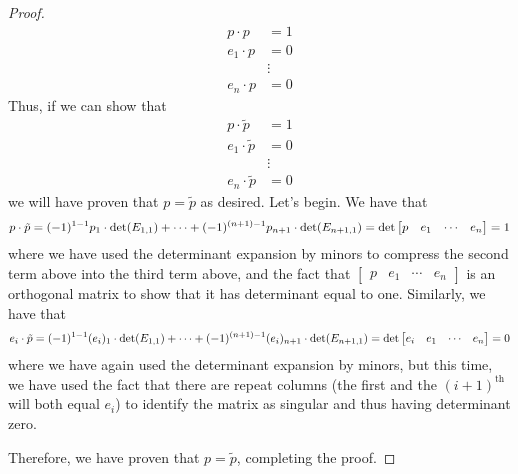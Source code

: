 \documentclass[../psets.tex]{subfiles}
\begin{document}
\begin{enumerate}[label={\textbf{4.4.\roman*.}}]
\begin{proof}
        \begin{align*}
            p\cdot p &= 1\\
            e_1\cdot p &= 0\\
            &\vdots\\
            e_n\cdot p &= 0
        \end{align*}
        Thus, if we can show that
        \begin{align*}
            p\cdot\tilde{p} &= 1\\
            e_1\cdot\tilde{p} &= 0\\
            &\vdots\\
            e_n\cdot\tilde{p} &= 0
        \end{align*}
        we will have proven that $p=\tilde{p}$ as desired. Let's begin. We have that
        \begin{equation*}
            p\cdot\tilde{p} = (-1)^{1-1}p_1\cdot\det(E_{1,1})+\cdots+(-1)^{(n+1)-1}p_{n+1}\cdot\det(E_{n+1,1})\\
            = \det
            \begin{bmatrix}
                p & e_1 & \cdots & e_n
            \end{bmatrix}
            = 1
        \end{equation*}
        where we have used the determinant expansion by minors to compress the second term above into the third term above, and the fact that $
        \begin{bmatrix}
            p & e_1 & \cdots & e_n
        \end{bmatrix}
        $ is an orthogonal matrix to show that it has determinant equal to one. Similarly, we have that
        \begin{equation*}
            e_i\cdot\tilde{p} = (-1)^{1-1}(e_i)_1\cdot\det(E_{1,1})+\cdots+(-1)^{(n+1)-1}(e_i)_{n+1}\cdot\det(E_{n+1,1})\\
            = \det
            \begin{bmatrix}
                e_i & e_1 & \cdots & e_n
            \end{bmatrix}
            = 0
        \end{equation*}
        where we have again used the determinant expansion by minors, but this time, we have used the fact that there are repeat columns (the first and the $(i+1)^\text{th}$ will both equal $e_i$) to identify the matrix as singular and thus having determinant zero.\par
        Therefore, we have proven that $p=\tilde{p}$, completing the proof.
    \end{proof}
\end{enumerate}
\end{document}
